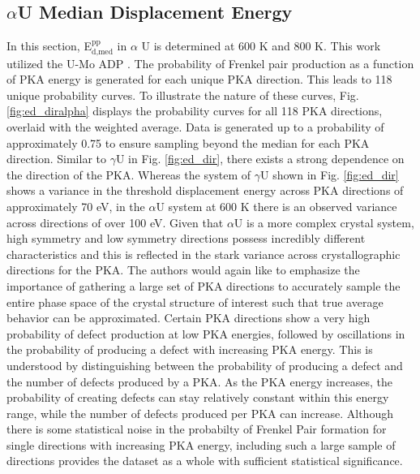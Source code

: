 \documentclass[review]{elsarticle}
\begin{document}
\FloatBarrier

\subsection{$\alpha$U Median Displacement Energy}

In this section, E$^{\textrm{pp}}_{\textrm{d,med}}$ in $\alpha$ U is determined at 600 K and 800 K. This work utilized the U-Mo ADP \cite{smirnovaADP}. The probability of Frenkel pair production as a function of PKA energy is generated for each unique PKA direction. This leads to 118 unique probability curves. To illustrate the nature of these curves, Fig. \ref{fig:ed_diralpha} displays the probability curves for all 118 PKA directions, overlaid with the weighted average. Data is generated up to a probability of approximately 0.75 to ensure sampling beyond the median for each PKA direction. Similar to $\gamma$U in Fig. \ref{fig:ed_dir}, there exists a strong dependence on the direction of the PKA. Whereas the system of $\gamma$U shown in Fig. \ref{fig:ed_dir} shows a variance in the threshold displacement energy across PKA directions of approximately 70 eV, in the $\alpha$U system at 600 K there is an observed variance across directions of over 100 eV. Given that $\alpha$U is a more complex crystal system, high symmetry and low symmetry directions possess incredibly different characteristics and this is reflected in the stark variance across crystallographic directions for the PKA. The authors would again like to emphasize the importance of gathering a large set of PKA directions to accurately sample the entire phase space of the crystal structure of interest such that true average behavior can be approximated. Certain PKA directions show a very high probability of defect production at low PKA energies, followed by oscillations in the probability of producing a defect with increasing PKA energy. This is understood by distinguishing between the probability of producing a defect and the number of defects produced by a PKA. As the PKA energy increases, the probability of creating defects can stay relatively constant within this energy range, while the number of defects produced per PKA can increase. Although there is some statistical noise in the probabilty of Frenkel Pair formation for single directions with increasing PKA energy, including such a large sample of directions provides the dataset as a whole with sufficient statistical significance. 
\end{document}
